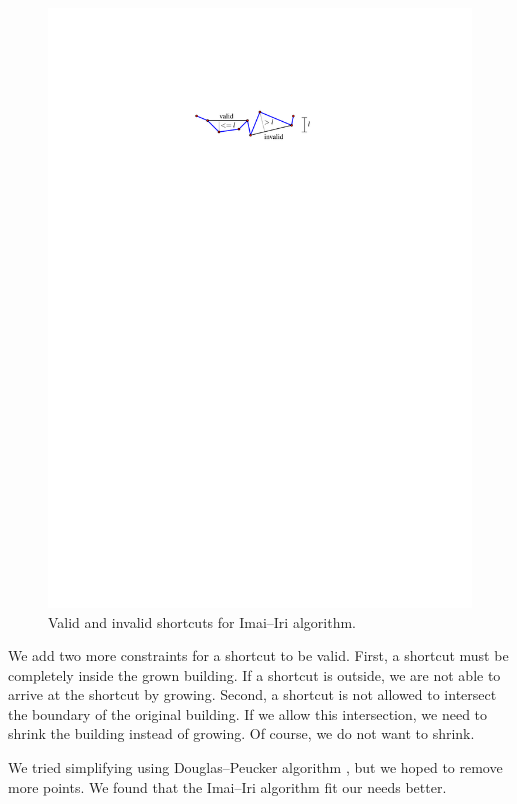 \documentclass[graybox]{svmult}
\begin{document}
\begin{figure}[tb]
	\centering
	\includegraphics[draft=false]{ImaiIri_Shortcut}
	\caption{Valid and invalid shortcuts for Imai--Iri algorithm.}
	\label{fig:ImaiIri_Shortcut}
\end{figure}

We add two more constraints for a shortcut to be valid. 
First, a shortcut must be completely inside the grown building.
If a shortcut is outside,
we are not able to arrive at the shortcut by growing.
Second, a shortcut is not allowed to intersect the 
boundary of the original building.
If we allow this intersection, 
we need to shrink the building instead of growing. 
Of course, we do not want to shrink.

We tried simplifying using Douglas--Peucker algorithm \parencite{Douglas1973}, 
but we hoped to remove more points. We found that the Imai--Iri 
algorithm fit our needs better. 
\end{document}
